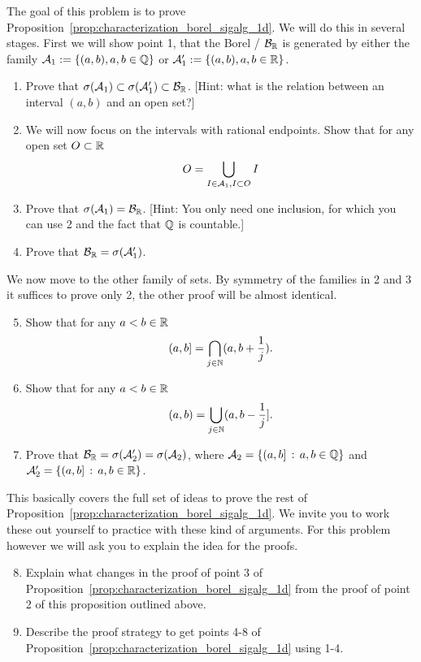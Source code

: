 \begin{problem}\label{prb:borel_sigalg_1d}
The goal of this problem is to prove Proposition~\ref{prop:characterization_borel_sigalg_1d}. We will do this in several stages. First we will show point 1, that the Borel \sigalg/ $\mathcal B_{\mathbb R}$ is generated by either the family $\mathcal A_1 := \{(a, b), a,b \in \mathbb Q\}$ or $\mathcal A_1^\prime := \{(a, b), a,b \in \mathbb R\}$.

\begin{enumerate}[label=(\alph*)]
\item Prove that $\sigma(\mathcal A_1) \subset \sigma(\mathcal A_1^\prime) \subset \mathcal B_{\mathbb R}$. [Hint: what is the relation between an interval $(a,b)$ and an open set?]
\item We will now focus on the intervals with rational endpoints. Show that for any open set $O \subset \mathbb R$
\[
	O = \bigcup_{I \in \mathcal A_1, I \subset O} I
\]
\item Prove that $\sigma(\mathcal A_1) = \mathcal B_{\mathbb R}$. [Hint: You only need one inclusion, for which you can use 2 and the fact that $\mathbb Q$ is countable.]
\item Prove that $\mathcal B_{\mathbb R} = \sigma(\mathcal A_1^\prime)$.
\end{enumerate}

We now move to the other family of sets. By symmetry of the families in 2 and 3 it suffices to prove only 2, the other proof will be almost identical.
\begin{enumerate}[label=(\alph*)]
\setcounter{enumi}{4}
\item Show that for any $a < b \in \mathbb R$
\[
	(a,b] = \bigcap_{j \in \mathbb N} (a, b+\frac{1}{j}).
\]
\item Show that for any $a < b \in \mathbb R$
\[
	(a,b) = \bigcup_{j \in \mathbb N} (a,b-\frac{1}{j}].
\]
\item Prove that $\mathcal B_{\mathbb R} = \sigma(\mathcal A_2^\prime) = \sigma(\mathcal A_2)$, where $\mathcal A_2 = \{(a,b] \, : \, a,b \in \mathbb Q\}$ and $\mathcal A_2^\prime = \{(a,b] \, : \, a,b \in \mathbb R\}$.
\end{enumerate}

This basically covers the full set of ideas to prove the rest of Proposition~\ref{prop:characterization_borel_sigalg_1d}. We invite you to work these out yourself to practice with these kind of arguments. For this problem however we will ask you to explain the idea for the proofs.
\begin{enumerate}[label=(\alph*)]
\setcounter{enumi}{7}
\item Explain what changes in the proof of point 3 of Proposition~\ref{prop:characterization_borel_sigalg_1d} from the proof of point 2 of this proposition outlined above.
\item Describe the proof strategy to get points 4-8 of Proposition~\ref{prop:characterization_borel_sigalg_1d} using 1-4.
\end{enumerate}
\end{problem}

